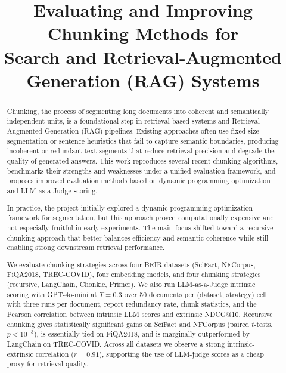\documentclass[conference]{IEEEtran}
\begin{document}
\title{Evaluating and Improving Chunking Methods for\\
Search and Retrieval-Augmented Generation (RAG) Systems}

\author{
}

\maketitle

\begin{abstract}
Chunking, the process of segmenting long documents into coherent and
semantically independent units, is a foundational step in retrieval-based
systems and Retrieval-Augmented Generation (RAG) pipelines. Existing
approaches often use fixed-size segmentation or sentence heuristics that fail
to capture semantic boundaries, producing incoherent or redundant text
segments that reduce retrieval precision and degrade the quality of
generated answers. This work reproduces several recent chunking algorithms,
benchmarks their strengths and weaknesses under a unified evaluation
framework, and proposes improved evaluation methods based on dynamic
programming optimization and LLM-as-a-Judge scoring.

In practice, the project initially explored a dynamic programming
optimization framework for segmentation, but this approach proved
computationally expensive and not especially fruitful in early experiments.
The main focus shifted toward a recursive chunking approach that better
balances efficiency and semantic coherence while still enabling strong
downstream retrieval performance.

We evaluate chunking strategies across four BEIR datasets (SciFact,
NFCorpus, FiQA2018, TREC-COVID), four embedding models, and four chunking
strategies (recursive, LangChain, Chonkie, Primer). We also run
LLM-as-a-Judge intrinsic scoring with GPT-4o-mini at $T=0.3$ over 50
documents per (dataset, strategy) cell with three runs per document, report
redundancy rate, chunk statistics, and the Pearson correlation between
intrinsic LLM scores and extrinsic NDCG@10. Recursive chunking gives
statistically significant gains on SciFact and NFCorpus (paired
$t$-tests, $p < 10^{-3}$), is essentially tied on FiQA2018, and is
marginally outperformed by LangChain on TREC-COVID. Across all datasets we
observe a strong intrinsic-extrinsic correlation
($\bar{r} = 0.91$), supporting the use of LLM-judge scores as a cheap
proxy for retrieval quality.
\end{abstract}
\end{document}
